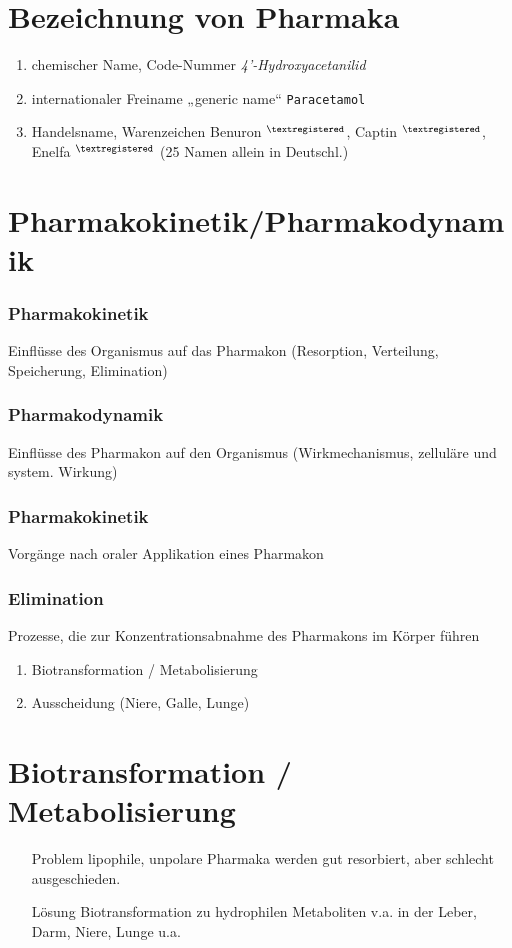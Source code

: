 \documentclass[10pt,a4paper]{report}
\begin{document}
\section{Bezeichnung von Pharmaka}
\begin{enumerate}
	\item chemischer Name, Code-Nummer	\textit{4’-Hydroxyacetanilid}
	\item internationaler Freiname „generic name“ \texttt{Paracetamol}
	\item Handelsname, Warenzeichen Benuron $^{\textregistered}$, Captin $ ^{\textregistered}$, Enelfa $^{\textregistered}$ 
	(25 Namen allein in Deutschl.)
\end{enumerate}

\section{Pharmakokinetik/Pharmakodynamik}

\subsubsection{Pharmakokinetik} 	
Einflüsse des Organismus auf das Pharmakon (Resorption, Verteilung, Speicherung, Elimination)

\subsubsection{Pharmakodynamik}
Einflüsse des Pharmakon auf den Organismus (Wirkmechanismus, zelluläre und system. Wirkung)

\subsubsection{Pharmakokinetik}  
Vorgänge nach oraler Applikation eines Pharmakon

\subsubsection{Elimination} 
Prozesse, die zur Konzentrationsabnahme des Pharmakons im Körper führen

\begin{enumerate}
	\item Biotransformation / Metabolisierung
	\item Ausscheidung (Niere, Galle, Lunge)
\end{enumerate}

\section{Biotransformation / Metabolisierung}
\begin{itemize}
	\item[Problem] lipophile, unpolare Pharmaka werden gut resorbiert, aber schlecht ausgeschieden. 
	\item[Lösung] Biotransformation zu hydrophilen Metaboliten v.a. in der Leber, Darm, Niere, Lunge u.a.
\end{itemize}
\end{document}
